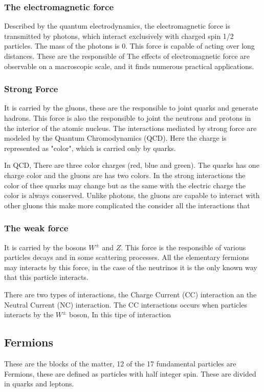 \subsubsection{The electromagnetic force}
Described by the quantum electrodynamics, the electromagnetic force is transmitted by photons, which interact exclusively with charged spin 1/2 particles. The mass of the photons is 0. This force is capable of acting over long distances. These are the responsible of  The effects of electromagnetic force are observable on a macroscopic scale, and it finds numerous practical applications.

\subsubsection{Strong Force}
It is carried by the gluons, these are the responsible to joint quarks and generate hadrons. This force is also the responsible to joint the neutrons and protons in the interior of the atomic nucleus. The interactions mediated by strong force are modeled by the Quantum Chromodynamics (QCD). Here the charge is represented as "color", which is carried only by quarks.

In QCD, There are three color charges (red, blue and green). The quarks has one charge color and the gluons are has two colors. In the strong interactions the color of thee quarks may change but as the same with the electric charge the color is always conserved. Unlike photons, the gluons are capable to interact with other gluons this make more complicated the consider all the interactions that    
 

\subsubsection{The weak force}
It is carried by the bosons $W^\pm$ and $Z$. This force is the responsible of various particles decays and in some scattering processes. All the elementary fermions may interacts by this force, in the case of the neutrinos it is the only known way that this particle interacts.

There are two types of interactions, the Charge Current (CC) interaction an the Neutral Current (NC) interaction. The CC interactions occurs when particles interacts by the $W^\pm$ boson, In this tipe of interaction 

\subsection{Fermions}
These are the blocks of the matter, 12 of the 17 fundamental particles are Fermions, these are defined as particles with half integer spin. These are divided in quarks and  leptons. 


